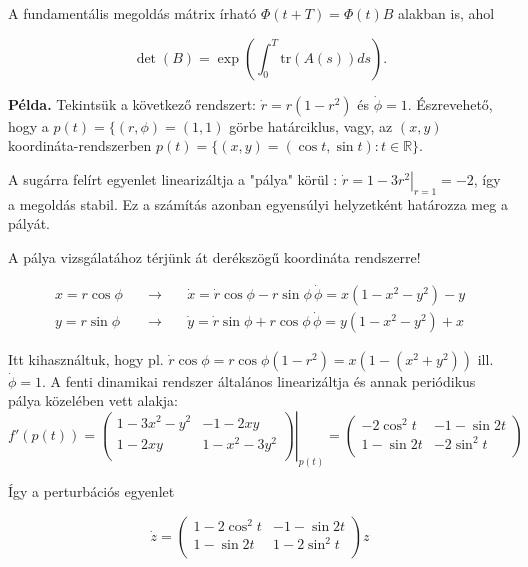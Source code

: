 A fundamentális megoldás mátrix írható $\Phi(t+T)=\Phi(t) B$ alakban is, ahol 

\begin{equation}
\det(B)=\exp \left( \int_0^T \mathrm{tr}(A(s)) ds\right).
\end{equation}

\textbf{Példa.} Tekintsük a következő rendszert: $\dot{r}=r (1-r^2)$ és $\dot{\phi} = 1$. Észrevehető, hogy a $p(t) = \{(r,\phi)=(1,1)$ görbe határciklus, vagy, az $(x,y)$ koordináta-rendszerben $p(t) = \{(x,y)=(\cos t,\sin t):t\in\mathbb{R}\}$.

A sugárra felírt egyenlet linearizáltja a "pálya" körül : $\dot{r}=\left.1-3r^2\right|_{r=1}=-2$, így a megoldás stabil. Ez a számítás azonban egyensúlyi helyzetként határozza meg a pályát.

A pálya vizsgálatához térjünk át derékszögű koordináta rendszerre!

\begin{align}
x=r\cos \phi& \quad \rightarrow \quad & \dot{x}=\dot{r} \cos \phi-r \sin\phi\, \dot{\phi}=x\left(1-x^2-y^2\right)-y\\
y=r\sin \phi& \quad \rightarrow \quad & \dot{y}=\dot{r} \sin \phi+r \cos\phi\, \dot{\phi}=y\left(1-x^2-y^2\right)+x
\end{align}

Itt kihasználtuk, hogy pl. $\dot{r}\cos \phi=r\cos\phi(1-r^2)=x(1-(x^2+y^2))$ ill. $\dot{\phi}=1$. A fenti dinamikai rendszer  általános linearizáltja és annak periódikus pálya közelében vett alakja:
\begin{equation}
f'(p(t)) = \left. \begin{pmatrix}
1-3x^2-y^2 & -1-2xy \\
1-2xy & 1-x^2-3y^2 \\
\end{pmatrix} \right|_{p(t)}=
\begin{pmatrix}
-2\cos^2t & -1-\sin 2t \\
1-\sin 2t & -2\sin^2t \\
\end{pmatrix}
\end{equation}

Így a perturbációs egyenlet

\begin{equation}
\dot{z}=\begin{pmatrix}
1-2\cos^2t & -1-\sin 2t \\
1-\sin 2t & 1-2\sin^2t \\
\end{pmatrix} z
\end{equation}

